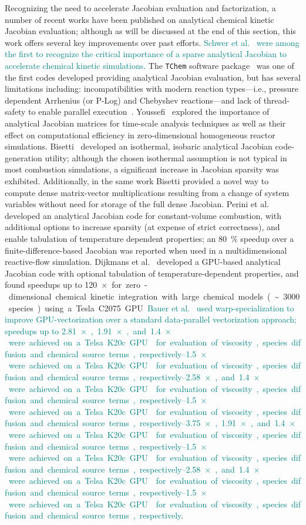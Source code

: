 \documentclass[12pt,number,sort&compress,preprint]{elsarticle}
\newcommand{\add}[1]{{\sloppy\textcolor{teal}{#1}}}  %
\begin{document}
Recognizing the need to accelerate Jacobian evaluation and factorization, a number of recent works have been published on analytical chemical kinetic Jacobian evaluation; although as will be discussed at the end of this section, this work offers several key improvements over past efforts.
\add{Schwer et al.~\cite{SCHWER2002270} were among the first to recognize the critical importance of a sparse analytical Jacobian to accelerate chemical kinetic simulations.}
The \texttt{TChem} software package~\cite{Safta:2011vn} was one of the first codes developed providing analytical Jacobian evaluation, but has several limitations including: incompatibilities with modern reaction types---i.e., pressure dependent Arrhenius (or P-Log) and Chebyshev reactions---and lack of thread-safety to enable parallel execution~\cite{Curtis2017:tchem}.
Youssefi~\cite{Youssefi:2011tm} explored the importance of analytical Jacobian matrices for time-scale analysis techniques as well as their effect on computational efficiency in zero-dimensional homogeneous reactor simulations.
Bisetti~\cite{Bisetti:2012jw} developed an isothermal, isobaric analytical Jacobian code-generation utility; although the chosen isothermal assumption is not typical in most combustion simulations, a significant increase in Jacobian sparsity was exhibited.
Additionally, in the same work Bisetti provided a novel way to compute dense matrix-vector multiplications resulting from a change of system variables without need for storage of the full dense Jacobian.
Perini et al.~\cite{Perini:2012gy} developed an analytical Jacobian code for constant-volume combustion, with additional options to increase sparsity (at expense of strict correctness), and enable tabulation of temperature dependent properties; an \SI{80}{\percent} speedup over a finite-difference-based Jacobian was reported when used in a multidimensional reactive-flow simulation.
Dijkmans et al.~\cite{Dijkmans:2014bb} developed a GPU-based analytical Jacobian code with optional tabulation of temperature-dependent properties, and found speedups up to \SI{120}{$\times$} for zero-dimensional chemical kinetic integration with large chemical models (\textasciitilde\num{3000} species) using a Tesla C2075 GPU.
\add{Bauer et al.~\cite{Bauer:2014} used warp-specialization to improve GPU-vectorization over a standard data-parallel vectorization approach; speedups up to \SIrange{2.81}{3.75}{$\times$}, \SIrange{1.91}{2.58}{$\times$}, and \SIrange{1.4}{1.5}{$\times$} were achieved on a Telsa K20c GPU\todo{keep hardware spec?} for evaluation of viscosity, species diffusion and chemical source terms, respectively}.
\end{document}
